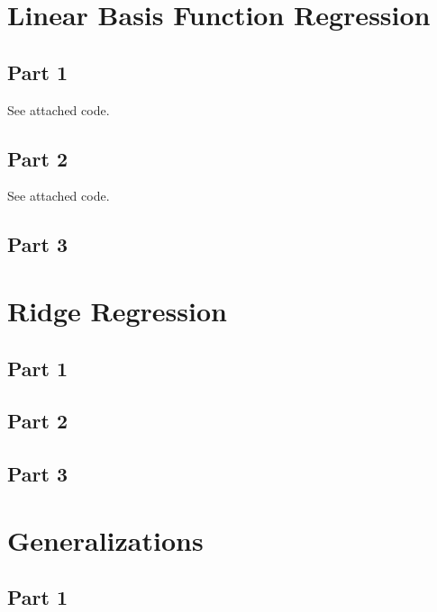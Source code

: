 \documentclass{sigchi}
\begin{document}
\section{Linear Basis Function Regression}

\subsection{Part 1}

See attached code.

\subsection{Part 2}

See attached code.

\subsection{Part 3}


\section{Ridge Regression}

\subsection{Part 1}


\subsection{Part 2}


\subsection{Part 3}


\section{Generalizations}

\subsection{Part 1}

\end{document}
